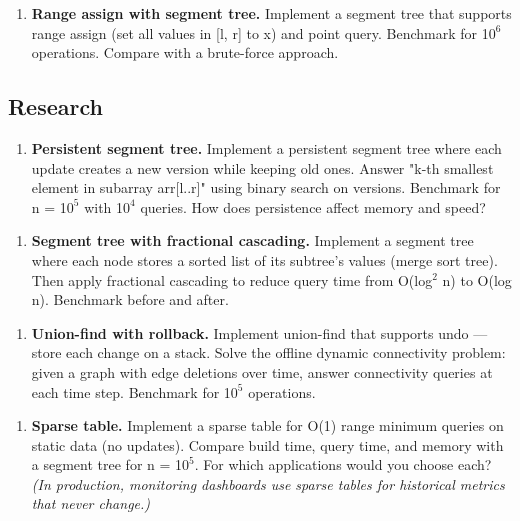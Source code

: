 \begin{enumerate}
\item \textbf{Range assign with segment tree.} Implement a segment tree that supports range assign (set all values in [l, r] to x) and point query. Benchmark for 1$0^{6}$ operations. Compare with a brute-force approach.
\end{enumerate}

\subsection{Research}

\begin{enumerate}
\item \textbf{Persistent segment tree.} Implement a persistent segment tree where each update creates a new version while keeping old ones. Answer "k-th smallest element in subarray arr[l..r]" using binary search on versions. Benchmark for n = 1$0^{5}$ with 1$0^{4}$ queries. How does persistence affect memory and speed?
\end{enumerate}

\begin{enumerate}
\item \textbf{Segment tree with fractional cascading.} Implement a segment tree where each node stores a sorted list of its subtree's values (merge sort tree). Then apply fractional cascading to reduce query time from O(log$^{2}$ n) to O(log n). Benchmark before and after.
\end{enumerate}

\begin{enumerate}
\item \textbf{Union-find with rollback.} Implement union-find that supports undo — store each change on a stack. Solve the offline dynamic connectivity problem: given a graph with edge deletions over time, answer connectivity queries at each time step. Benchmark for 1$0^{5}$ operations.
\end{enumerate}

\begin{enumerate}
\item \textbf{Sparse table.} Implement a sparse table for O(1) range minimum queries on static data (no updates). Compare build time, query time, and memory with a segment tree for n = 1$0^{5}$. For which applications would you choose each? \textit{(In production, monitoring dashboards use sparse tables for historical metrics that never change.)}
\end{enumerate}

